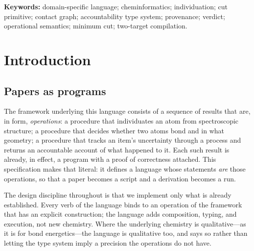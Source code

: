 \documentclass[11pt,twocolumn,a4paper]{article}
\theoremstyle{thmstyle}
\theoremstyle{definition}
\theoremstyle{remark}
\begin{document}
\begin{abstract}
Structures enter honjo through a separate converter, which supplies
contact graphs carrying per-element provenance; honjo's contribution is
what happens after, and the interface between them is specified here as a
typed import that refuses rather than silently accepting a graph whose
provenance does not meet a program's stated requirement. We state what
the language does not do, including three limitations of the underlying
chemistry it inherits and cannot repair.
\end{abstract}

\noindent\textbf{Keywords:} domain-specific language; cheminformatics;
individuation; cut primitive; contact graph; accountability type system;
provenance; verdict; operational semantics; minimum cut; two-target
compilation.

\tableofcontents

\section{Introduction}
\label{sec:intro}

\subsection{Papers as programs}

The framework underlying this language consists of a sequence of results
that are, in form, \emph{operations}: a procedure that individuates an
atom from spectroscopic structure; a procedure that decides whether two
atoms bond and in what geometry; a procedure that tracks an item's
uncertainty through a process and returns an accountable account of what
happened to it. Each such result is already, in effect, a program with a
proof of correctness attached. This specification makes that literal: it
defines a language whose statements \emph{are} those operations, so that
a paper becomes a script and a derivation becomes a run.

The design discipline throughout is that we implement only what is
already established. Every verb of the language binds to an operation of
the framework that has an explicit construction; the language adds
composition, typing, and execution, not new chemistry. Where the
underlying chemistry is qualitative---as it is for bond energetics---the
language is qualitative too, and  says so rather than
letting the type system imply a precision the operations do not have.
\end{document}
